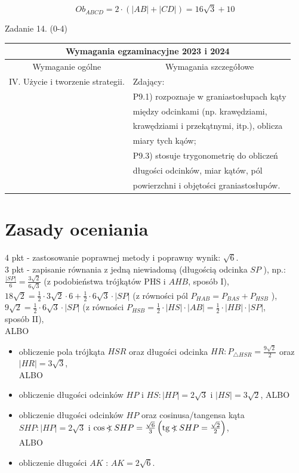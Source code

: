 \documentclass[10pt]{article}
\newcommand\Varangle{\mathop{{<\!\!\!\!\!\text{\small)}}\:}\nolimits}
\begin{document}
$$
O b_{A B C D}=2 \cdot(|A B|+|C D|)=16 \sqrt{3}+10
$$

Zadanie 14. (0-4)

\begin{center}
\begin{tabular}{|l|l|}
\hline
\multicolumn{2}{|c|}{Wymagania egzaminacyjne 2023 i 2024} \\
\hline
\multicolumn{1}{|c|}{Wymaganie ogólne} & \multicolumn{1}{c|}{Wymagania szczegółowe} \\
\hline
IV. Użycie i tworzenie strategii. & Zdający: \\
 & P9.1) rozpoznaje w graniastosłupach kąty \\
 & między odcinkami (np. krawędziami, \\
 & krawędziami i przekątnymi, itp.), oblicza \\
 & miary tych kąów; \\
 & P9.3) stosuje trygonometrię do obliczeń \\
 & długości odcinków, miar kątów, pól \\
 & powierzchni i objętości graniastosłupów. \\
\hline
\end{tabular}
\end{center}

\section*{Zasady oceniania}
4 pkt - zastosowanie poprawnej metody i poprawny wynik: $\sqrt{6}$.\\
3 pkt - zapisanie równania z jedną niewiadomą (długością odcinka $S P$ ), np.:\\
$\frac{|S P|}{6}=\frac{3 \sqrt{2}}{6 \sqrt{3}}$ (z podobieństwa trójkątów PHS i $A H B$, sposób I),\\
$18 \sqrt{2}=\frac{1}{2} \cdot 3 \sqrt{2} \cdot 6+\frac{1}{2} \cdot 6 \sqrt{3} \cdot|S P|$ (z równości pól $P_{H A B}=P_{B A S}+P_{H S B}$ ),\\
$9 \sqrt{2}=\frac{1}{2} \cdot 6 \sqrt{3} \cdot|S P|$ (z równości $P_{H S B}=\frac{1}{2} \cdot|H S| \cdot|A B|=\frac{1}{2} \cdot|H B| \cdot|S P|$,\\
sposób II),\\
ALBO

\begin{itemize}
  \item obliczenie pola trójkąta $H S R$ oraz długości odcinka $H R: P_{\triangle H S R}=\frac{9 \sqrt{2}}{2}$ oraz $|H R|=3 \sqrt{3}$,\\
ALBO
  \item obliczenie długości odcinków $H P$ i $H S:|H P|=2 \sqrt{3}$ i $|H S|=3 \sqrt{2}$, ALBO
  \item obliczenie długości odcinków $H P$ oraz cosinusa/tangensa kąta $S H P:|H P|=2 \sqrt{3}$ i $\cos \Varangle S H P=\frac{\sqrt{6}}{3}\left(\operatorname{tg} \Varangle S H P=\frac{\sqrt{2}}{2}\right)$,\\
ALBO
  \item obliczenie długości $A K$ : $A K=2 \sqrt{6}$.
\end{itemize}
\end{document}
